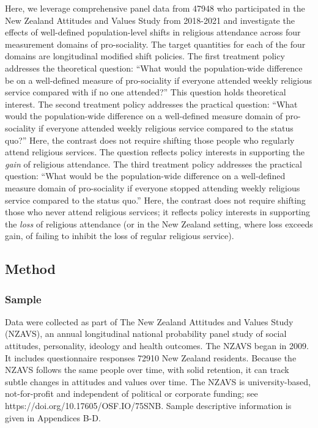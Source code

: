 \documentclass[
  singlecolumn]{article}
\begin{document}
Here, we leverage comprehensive panel data from 47948 who participated
in the New Zealand Attitudes and Values Study from 2018-2021 and
investigate the effects of well-defined population-level shifts in
religious attendance across four measurement domains of pro-sociality.
The target quantities for each of the four domains are longitudinal
modified shift policies. The first treatment policy addresses the
theoretical question: ``What would the population-wide difference be on
a well-defined measure of pro-sociality if everyone attended weekly
religious service compared with if no one attended?'' This question
holds theoretical interest. The second treatment policy addresses the
practical question: ``What would the population-wide difference on a
well-defined measure domain of pro-sociality if everyone attended weekly
religious service compared to the status quo?'' Here, the contrast does
not require shifting those people who regularly attend religious
services. The question reflects policy interests in supporting the
\emph{gain} of religious attendance. The third treatment policy
addresses the practical question: ``What would be the population-wide
difference on a well-defined measure domain of pro-sociality if everyone
stopped attending weekly religious service compared to the status quo.''
Here, the contrast does not require shifting those who never attend
religious services; it reflects policy interests in supporting the
\emph{loss} of religious attendance (or in the New Zealand setting,
where loss exceeds gain, of failing to inhibit the loss of regular
religious service).

\subsection{Method}\label{method}

\subsubsection{Sample}\label{sample}

Data were collected as part of The New Zealand Attitudes and Values
Study (NZAVS), an annual longitudinal national probability panel study
of social attitudes, personality, ideology and health outcomes. The
NZAVS began in 2009. It includes questionnaire responses 72910 New
Zealand residents. Because the NZAVS follows the same people over time,
with solid retention, it can track subtle changes in attitudes and
values over time. The NZAVS is university-based, not-for-profit and
independent of political or corporate funding; see
https://doi.org/10.17605/OSF.IO/75SNB. Sample descriptive information is
given in Appendices B-D.
\end{document}
